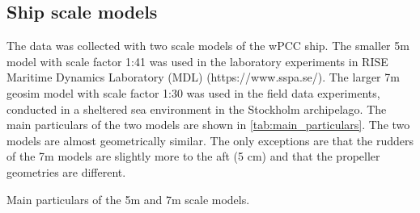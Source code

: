 \subsection{Ship scale models}
\label{sec:ship_scale_models}
The data was collected with two scale models of the wPCC ship. The smaller 5m model with scale factor 1:41 was used in the laboratory experiments in RISE Maritime Dynamics Laboratory (MDL) (https://www.sspa.se/). The larger 7m geosim model with scale factor 1:30 was used in the field data experiments, conducted in a sheltered sea environment in the Stockholm archipelago. The main particulars of the two models are shown in \autoref{tab:main_particulars}. The two models are almost geometrically similar. The only exceptions are that the rudders of the 7m models are slightly more to the aft (5 cm) and that the propeller geometries are different.
\begin{table}[!ht]
    \centering
    \caption{Main particulars of the 5m and 7m scale models.}
    \label{tab:main_particulars}

\end{table}